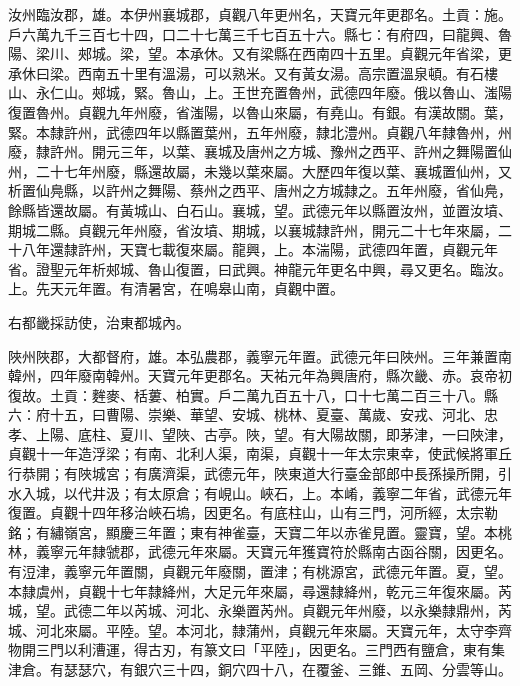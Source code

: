 \begin{pinyinscope}
 汝州臨汝郡，雄。本伊州襄城郡，貞觀八年更州名，天寶元年更郡名。土貢：施。戶六萬九千三百七十四，口二十七萬三千七百五十六。縣七：有府四，曰龍興、魯陽、梁川、郟城。梁，望。本承休。又有梁縣在西南四十五里。貞觀元年省梁，更承休曰梁。西南五十里有溫湯，可以熟米。又有黃女湯。高宗置溫泉頓。有石樓山、永仁山。郟城，緊。魯山，上。王世充置魯州，武德四年廢。俄以魯山、滍陽復置魯州。貞觀九年州廢，省滍陽，以魯山來屬，有堯山。有銀。有漢故關。葉，緊。本隸許州，武德四年以縣置葉州，五年州廢，隸北澧州。貞觀八年隸魯州，州廢，隸許州。開元三年，以葉、襄城及唐州之方城、豫州之西平、許州之舞陽置仙州，二十七年州廢，縣還故屬，未幾以葉來屬。大歷四年復以葉、襄城置仙州，又析置仙鳧縣，以許州之舞陽、蔡州之西平、唐州之方城隸之。五年州廢，省仙鳧，餘縣皆還故屬。有黃城山、白石山。襄城，望。武德元年以縣置汝州，並置汝墳、期城二縣。貞觀元年州廢，省汝墳、期城，以襄城隸許州，開元二十七年來屬，二十八年還隸許州，天寶七載復來屬。龍興，上。本湍陽，武德四年置，貞觀元年省。證聖元年析郟城、魯山復置，曰武興。神龍元年更名中興，尋又更名。臨汝。上。先天元年置。有清暑宮，在鳴皋山南，貞觀中置。



 右都畿採訪使，治東都城內。



 陜州陜郡，大都督府，雄。本弘農郡，義寧元年置。武德元年曰陜州。三年兼置南韓州，四年廢南韓州。天寶元年更郡名。天祐元年為興唐府，縣次畿、赤。哀帝初復故。土貢：麰麥、栝蔞、柏實。戶二萬九百五十八，口十七萬二百三十八。縣六：府十五，曰曹陽、崇樂、華望、安城、桃林、夏臺、萬歲、安戎、河北、忠孝、上陽、底柱、夏川、望陜、古亭。陜，望。有大陽故關，即茅津，一曰陜津，貞觀十一年造浮梁；有南、北利人渠，南渠，貞觀十一年太宗東幸，使武候將軍丘行恭開；有陜城宮；有廣濟渠，武德元年，陜東道大行臺金部郎中長孫操所開，引水入城，以代井汲；有太原倉；有峴山。峽石，上。本崤，義寧二年省，武德元年復置。貞觀十四年移治峽石塢，因更名。有底柱山，山有三門，河所經，太宗勒銘；有繡嶺宮，顯慶三年置；東有神雀臺，天寶二年以赤雀見置。靈寶，望。本桃林，義寧元年隸虢郡，武德元年來屬。天寶元年獲寶符於縣南古函谷關，因更名。有浢津，義寧元年置關，貞觀元年廢關，置津；有桃源宮，武德元年置。夏，望。本隸虞州，貞觀十七年隸絳州，大足元年來屬，尋還隸絳州，乾元三年復來屬。芮城，望。武德二年以芮城、河北、永樂置芮州。貞觀元年州廢，以永樂隸鼎州，芮城、河北來屬。平陸。望。本河北，隸蒲州，貞觀元年來屬。天寶元年，太守李齊物開三門以利漕運，得古刃，有篆文曰「平陸」，因更名。三門西有鹽倉，東有集津倉。有瑟瑟穴，有銀穴三十四，銅穴四十八，在覆釜、三錐、五岡、分雲等山。




\end{pinyinscope}
